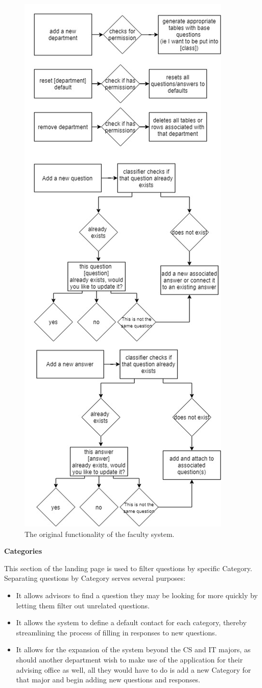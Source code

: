 \documentclass[titlepage, 12pt]{article}
\begin{document}
\begin{figure}[p]
    \centering\includegraphics[width=0.5\linewidth]{images/original-faculty-flowchart.png}
    \caption{The original functionality of the faculty system.}
\end{figure}


\textbf{Categories}

This section of the landing page is used to filter questions by specific Category. Separating questions by Category serves several purposes:

\begin{itemize}
    \item It allows advisors to find a question they may be looking for more quickly by letting them filter out unrelated questions.
    \item It allows the system to define a default contact for each category, thereby streamlining the process of filling in responses to new questions.
    \item It allows for the expansion of the system beyond the CS and IT majors, as should another department wish to make use of the application for their advising office as well, all they would have to do is add a new Category for that major and begin adding new questions and responses.
\end{itemize}
\end{document}
